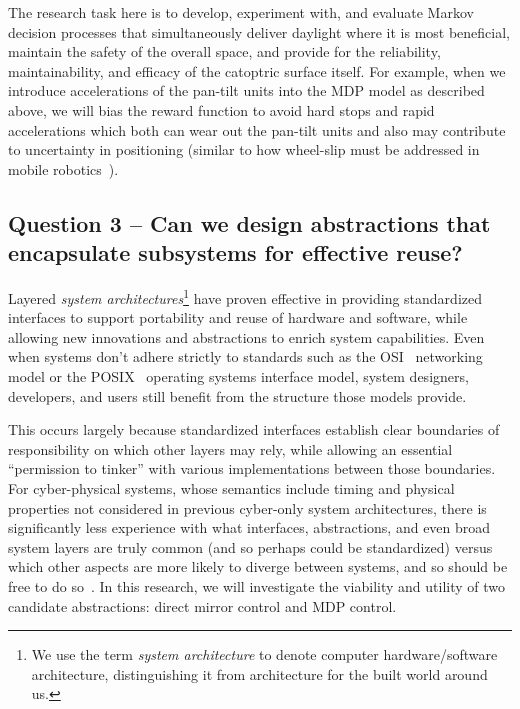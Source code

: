 The research task here is to develop, experiment with, and evaluate
Markov decision processes that simultaneously deliver daylight where it
is most beneficial, maintain the safety of the overall space,
and provide for the reliability, maintainability, and efficacy of the
catoptric surface itself.  For example, when we introduce accelerations
of the pan-tilt units into the MDP model as described above, we will bias
the reward function to avoid hard stops and rapid accelerations which both
can wear out the pan-tilt units and also may contribute to uncertainty in
positioning (similar to how wheel-slip must be addressed in mobile
robotics~\cite{mn87}).

\subsection{Question 3 -- Can we design abstractions that encapsulate
subsystems for effective reuse?}

Layered \emph{system architectures}\footnote{We use the term
\emph{system architecture}
to denote computer hardware/software architecture, distinguishing it from
architecture for the built world around us.}
have proven effective in providing standardized interfaces to
support portability
and reuse of hardware and software,
while allowing new innovations and abstractions
to enrich system capabilities.
Even when systems don't adhere strictly to standards
such as the OSI~\cite{osi} networking model or the POSIX~\cite{posix} operating
systems interface model, system designers, developers,
and users still benefit
from the structure those models provide.

This occurs largely because standardized interfaces establish clear
boundaries of responsibility on which other layers may rely, while allowing an essential
``permission to tinker'' with various implementations between those
boundaries. For cyber-physical systems, whose semantics include timing
and physical properties not considered in previous cyber-only system
architectures, there is significantly less experience with what interfaces,
abstractions, and even broad system layers are truly common (and so perhaps
could be standardized) versus which other aspects are more likely to
diverge between systems, and so should be free to do so~\cite{cag18}.
In this research, we will investigate the viability and utility of
two candidate abstractions: direct mirror control and MDP control.


